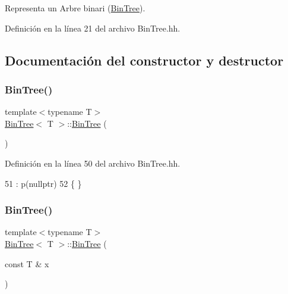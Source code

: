 Representa un Arbre binari (\mbox{\hyperlink{class_bin_tree}{Bin\+Tree}}). 

Definición en la línea 21 del archivo Bin\+Tree.\+hh.



\subsection{Documentación del constructor y destructor}
\mbox{\label{class_bin_tree_a47eef22d29cd023449d97c073c08e5b6}} 
\subsubsection{\texorpdfstring{Bin\+Tree()}{BinTree()}\hspace{0.1cm}{\footnotesize\ttfamily [1/3]}}
{\footnotesize\ttfamily template$<$typename T$>$ \\
\mbox{\hyperlink{class_bin_tree}{Bin\+Tree}}$<$ T $>$\+::\mbox{\hyperlink{class_bin_tree}{Bin\+Tree}} (\begin{DoxyParamCaption}{ }\end{DoxyParamCaption})}



Definición en la línea 50 del archivo Bin\+Tree.\+hh.


\begin{DoxyCode}
51     :   p(\textcolor{keyword}{nullptr})
52     \{   \}
\end{DoxyCode}
\mbox{\label{class_bin_tree_a1ab686e0bcf990093ff91fe71744c1a4}} 
\subsubsection{\texorpdfstring{Bin\+Tree()}{BinTree()}\hspace{0.1cm}{\footnotesize\ttfamily [2/3]}}
{\footnotesize\ttfamily template$<$typename T$>$ \\
\mbox{\hyperlink{class_bin_tree}{Bin\+Tree}}$<$ T $>$\+::\mbox{\hyperlink{class_bin_tree}{Bin\+Tree}} (\begin{DoxyParamCaption}\item[{const T \&}]{x }\end{DoxyParamCaption})\hspace{0.3cm}{\ttfamily [explicit]}}



